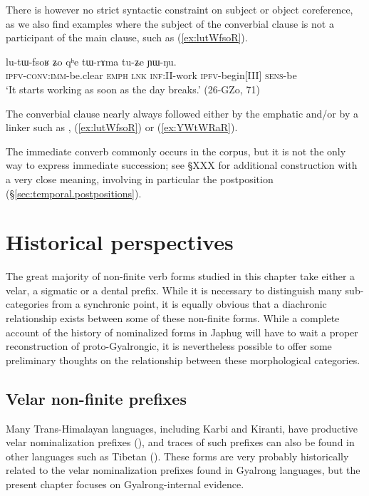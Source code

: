 There is however no strict syntactic constraint on subject or object coreference, as we also find examples where the subject of the converbial clause is not a participant of the main clause, such as (\ref{ex:lutWfsoR}). 

\begin{exe}
\ex \label{ex:lutWfsoR} 
\gll  lu-tɯ-fsoʁ ʑo qʰe tɯ-rɤma tu-ʑe ɲɯ-ŋu. \\
\textsc{ipfv-conv:imm}-be.clear \textsc{emph} \textsc{lnk} \textsc{inf:II}-work \textsc{ipfv}-begin[III] \textsc{sens}-be \\
\glt `It starts working as soon as the day breaks.' (26-GZo, 71)
\end{exe}

The converbial clause nearly always followed either by the emphatic  and/or by a linker such as ,  (\ref{ex:lutWfsoR}) or  (\ref{ex:YWtWRaR}).

The immediate converb commonly occurs in the corpus, but it is not the only way to express immediate succession; see §XXX for additional construction with a very close meaning, involving in particular the postposition  (§\ref{sec:temporal.postpositions}).


\section{Historical perspectives} \label{sec:nmlz.historical.perspectives}
The great majority of non-finite verb forms studied in this chapter take either a velar, a sigmatic or a dental prefix. While it is necessary to distinguish many sub-categories from a synchronic point, it is equally obvious that a diachronic relationship exists between some of these non-finite forms. While a complete account of the history of nominalized forms in Japhug will have to wait a proper reconstruction of proto-Gyalrongic, it is nevertheless possible to offer some preliminary thoughts on the relationship between these morphological categories.

\subsection{Velar non-finite prefixes} \label{sec:velar.nmlz.history}
Many Trans-Himalayan languages, including Karbi and Kiranti, have productive velar nominalization prefixes (\citealt{konnerth16gV}), and traces of such prefixes can also be found in other languages such as Tibetan (\citealt{jacques14snom}). These forms are very probably historically related to the velar nominalization prefixes found in Gyalrong languages, but the present chapter focuses on Gyalrong-internal evidence.

